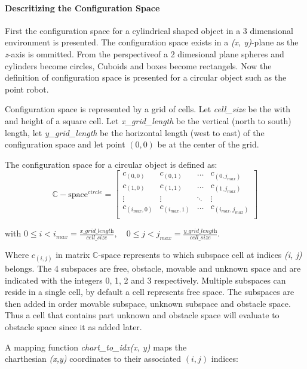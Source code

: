 \paragraph{Descritizing the Configuration Space}
First the configuration space for a cylindrical shaped object in a 3 dimensional environment is presented. The configuration space exists in  a \textit{(x, y)}-plane as the \textit{z}-axis is ommitted. From the perspectiveof a 2 dimesional plane spheres and cylinders become circles, Cuboids and boxes become rectangels. Now the definition of configuration space is presented for a circular object such as the point robot.\bs

Configuration space is represented by a grid of cells. Let \textit{cell\_size} be the with and height of a square cell. Let \textit{x\_grid\_length} be the vertical (north to south) length, let \textit{y\_grid\_length} be the horizontal length (west to east) of the configuration space and let point $(0, 0)$ be at the center of the grid.\bs

The configuration space for a circular object is defined as:\bs
\[ \mathbb{C}-\textrm{space}^{\textit{circle}} = 
\begin{bmatrix}
  c_{(0,0)} & c_{(0,1)} & \hdots & c_{(0,j_{max})}\\
  c_{(1,0)} & c_{(1,1)} & \hdots & c_{(1,j_{max})}\\
  \vdots &  \vdots & \ddots & \vdots\\
  c_{(i_{max},0)} & c_{(i_{max},1)} & \hdots & c_{(i_{max},j_{max})}\\
\end{bmatrix}
\]

with $0 \leq i < i_{max} = \frac{\textit{x\_grid\_length}}{\textit{cell\_size}}, \quad 0 \leq j < j_{max} = \frac{\textit{y\_grid\_length}}{\textit{cell\_size}}$.\bs

Where $c_{(i,j)}$ in matrix $\mathbb{C}$-space represents to which subspace cell at indices \textit{(i, j)} belongs. The 4 subspaces are free, obstacle, movable and unknown space and are indicated with the integers 0, 1, 2 and 3 respectively. Multiple subspaces can reside in a single cell, by default a cell represents free space. The subspaces are then added in order movable subspace, unknown subspace and obstacle space. Thus a cell that contains part unknown and obstacle space will evaluate to obstacle space since it as added later.\bs

A mapping function \textit{chart\_to\_idx(x, y)} maps the\\charthesian \textit{(x,y)} coordinates to their associated $(i,j)$ indices:

